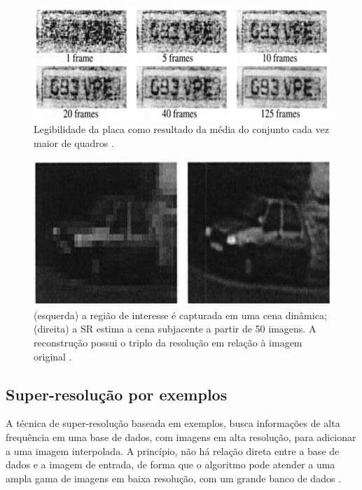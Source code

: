 \begin{figure}[h]
	\centering
	\includegraphics[scale=0.45]{figuras/SR_img_2.png}
	\caption{Legibilidade da placa como resultado da média do conjunto cada vez maior de quadros \cite{kang2000digital}.} 
	\label{fig:SR_2}
\end{figure}

\begin{figure}[h]
	\centering
	\includegraphics[scale=0.45]{figuras/img_SR_3.png}
	\caption{(esquerda) a região de interesse é capturada em uma cena dinâmica; (direita) a SR estima a cena subjacente a partir de 50 imagens. A reconstrução possui o triplo da resolução em relação à imagem original \cite{kang2000digital}.}
	\label{fig:SR_3}
\end{figure}

\subsection{Super-resolução por exemplos}

A técnica de super-resolução baseada em exemplos, busca informações de alta frequência em uma base de dados, com imagens em alta resolução, para adicionar a uma imagem interpolada. A princípio, não há relação direta entre a base de dados e a imagem de entrada, de forma que o algoritmo pode atender a uma ampla gama de imagens em baixa resolução, com um grande banco de dados \cite{freeman2002example}.

